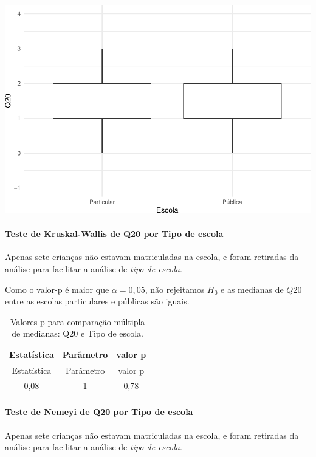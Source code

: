 \documentclass[]{article}
\let\oldparagraph\paragraph
\renewcommand{\paragraph}[1]{\oldparagraph{#1}\mbox{}}
\begin{document}
\begin{center}\includegraphics[width=0.75\linewidth]{relatorio_files/figure-latex/unnamed-chunk-320-1} \end{center}

\hypertarget{teste-de-kruskal-wallis-de-q20-por-tipo-de-escola}{%
\paragraph{Teste de Kruskal-Wallis de Q20 por Tipo de escola}\label{teste-de-kruskal-wallis-de-q20-por-tipo-de-escola}}

Apenas sete crianças não estavam matriculadas na escola, e foram retiradas da análise para facilitar a análise de \emph{tipo de escola}.

Como o valor-p é maior que \(\alpha=0,05\), não rejeitamos \(H_0\) e as medianas de \(Q20\) entre as escolas particulares e públicas são iguais.

\begin{longtable}[]{@{}ccc@{}}
\caption{\label{tab:unnamed-chunk-321}Valores-p para comparação múltipla de medianas: Q20 e Tipo de escola.}\tabularnewline
\toprule
Estatística & Parâmetro & valor p\tabularnewline
\midrule
\endfirsthead
\toprule
Estatística & Parâmetro & valor p\tabularnewline
\midrule
\endhead
0,08 & 1 & 0,78\tabularnewline
\bottomrule
\end{longtable}

\hypertarget{teste-de-nemeyi-de-q20-por-tipo-de-escola}{%
\paragraph{Teste de Nemeyi de Q20 por Tipo de escola}\label{teste-de-nemeyi-de-q20-por-tipo-de-escola}}

Apenas sete crianças não estavam matriculadas na escola, e foram retiradas da análise para facilitar a análise de \emph{tipo de escola}.
\end{document}
